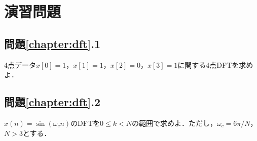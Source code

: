 

\section*{演習問題}

\subsection*{問題\ref{chapter:dft}.1}

4点データ$x[0]=1$，$x[1]=1$，$x[2]=0$，$x[3]=1$に関する4点DFTを求めよ．

\subsection*{問題\ref{chapter:dft}.2}

$x(n)=\sin ( \omega_c n)$のDFTを$0 \leq k < N$の範囲で求めよ．ただし，$\omega_c=6\pi /N$，$N>3$とする．



